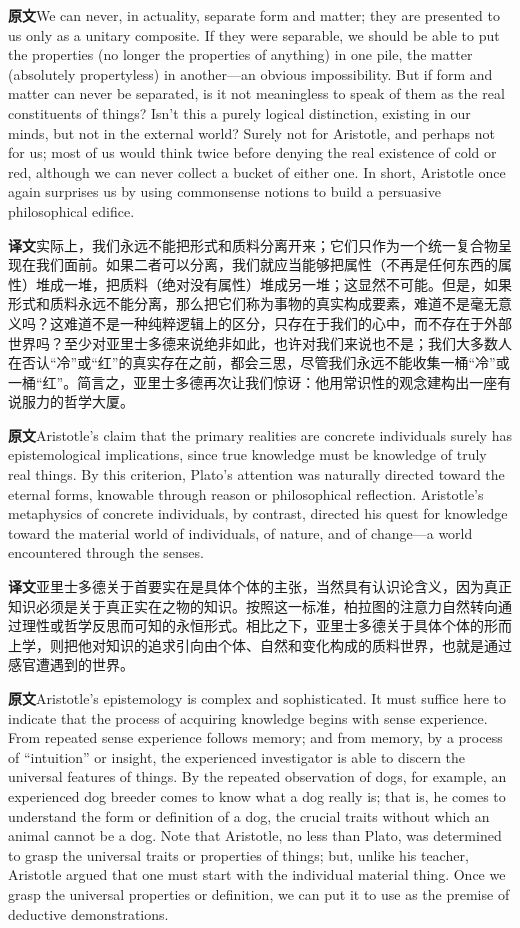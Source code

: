 \documentclass[UTF8,zihao=-4]{ctexart}
\newcommand{\BodyFont}{\fontsize{10.5pt}{15.5pt}\selectfont}
\newcommand{\origlabel}{\textbf{原文}\quad}
\newcommand{\translabel}{\textbf{译文}\quad}
\newcommand{\orig}{\par\noindent\begingroup\BodyFont\origlabel}
\newcommand{\zhline}[1]{\par\endgroup\noindent\begingroup\BodyFont\translabel #1\par\endgroup\vspace{0.35em}}
\begin{document}
\orig We can never, in actuality, separate form and matter; they are presented to us only as a unitary composite. If they were separable, we should be able to put the properties (no longer the properties of anything) in one pile, the matter (absolutely propertyless) in another---an obvious impossibility. But if form and matter can never be separated, is it not meaningless to speak of them as the real constituents of things? Isn't this a purely logical distinction, existing in our minds, but not in the external world? Surely not for Aristotle, and perhaps not for us; most of us would think twice before denying the real existence of cold or red, although we can never collect a bucket of either one. In short, Aristotle once again surprises us by using commonsense notions to build a persuasive philosophical edifice.

\zhline{实际上，我们永远不能把形式和质料分离开来；它们只作为一个统一复合物呈现在我们面前。如果二者可以分离，我们就应当能够把属性（不再是任何东西的属性）堆成一堆，把质料（绝对没有属性）堆成另一堆；这显然不可能。但是，如果形式和质料永远不能分离，那么把它们称为事物的真实构成要素，难道不是毫无意义吗？这难道不是一种纯粹逻辑上的区分，只存在于我们的心中，而不存在于外部世界吗？至少对亚里士多德来说绝非如此，也许对我们来说也不是；我们大多数人在否认“冷”或“红”的真实存在之前，都会三思，尽管我们永远不能收集一桶“冷”或一桶“红”。简言之，亚里士多德再次让我们惊讶：他用常识性的观念建构出一座有说服力的哲学大厦。}

\orig Aristotle's claim that the primary realities are concrete individuals surely has epistemological implications, since true knowledge must be knowledge of truly real things. By this criterion, Plato's attention was naturally directed toward the eternal forms, knowable through reason or philosophical reflection. Aristotle's metaphysics of concrete individuals, by contrast, directed his quest for knowledge toward the material world of individuals, of nature, and of change---a world encountered through the senses.

\zhline{亚里士多德关于首要实在是具体个体的主张，当然具有认识论含义，因为真正知识必须是关于真正实在之物的知识。按照这一标准，柏拉图的注意力自然转向通过理性或哲学反思而可知的永恒形式。相比之下，亚里士多德关于具体个体的形而上学，则把他对知识的追求引向由个体、自然和变化构成的质料世界，也就是通过感官遭遇到的世界。}

\orig Aristotle's epistemology is complex and sophisticated. It must suffice here to indicate that the process of acquiring knowledge begins with sense experience. From repeated sense experience follows memory; and from memory, by a process of ``intuition'' or insight, the experienced investigator is able to discern the universal features of things. By the repeated observation of dogs, for example, an experienced dog breeder comes to know what a dog really is; that is, he comes to understand the form or definition of a dog, the crucial traits without which an animal cannot be a dog. Note that Aristotle, no less than Plato, was determined to grasp the universal traits or properties of things; but, unlike his teacher, Aristotle argued that one must start with the individual material thing. Once we grasp the universal properties or definition, we can put it to use as the premise of deductive demonstrations.
\end{document}
